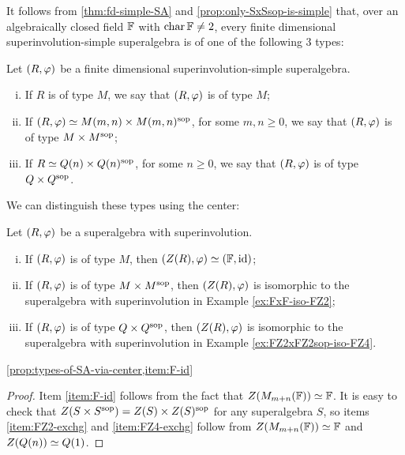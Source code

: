 It follows from \cref{thm:fd-simple-SA} and \cref{prop:only-SxSsop-is-simple} that, over an algebraically closed field $\mathbb{F}$ with $\operatorname{char} \mathbb{F} \neq 2$, every finite dimensional superinvolution-simple superalgebra is of one of the following 3 types:

\begin{defi}\label{defi:types-sinv-simple}
    Let $(R, \varphi)$ be a finite dimensional superinvolution-simple superalgebra. 
    \begin{enumerate}[(i)]
        \item If $R$ is of type $M$, we say that $(R, \varphi)$ is of type $M$;
        \item If $(R, \varphi) \simeq M(m,n) \times M(m,n)^{\mathrm{sop}}$, for some $m,n \geq 0$, we say that $(R, \varphi)$ is of type $M\times M^{\mathrm{sop}}$;
        \item If $R \simeq Q(n) \times Q(n)^{\mathrm{sop}}$, for some $n \geq 0$, we say that $(R, \varphi)$ is of type $Q \times Q^{\mathrm{sop}}$.
    \end{enumerate}
\end{defi}

We can distinguish these types using the center:

\begin{prop}\label{prop:types-of-SA-via-center}
	Let $(R, \varphi)$ be a superalgebra with superinvolution.
	\begin{enumerate}[(i)]
		\item If $(R, \varphi)$ is of type $M$, then $(Z(R), \varphi) \simeq (\mathbb{F}, \operatorname{id})$;\label{item:F-id}
		\item If $(R, \varphi)$ is of type $M\times M^{\mathrm{sop}}$, then $(Z(R), \varphi)$ is isomorphic to the superalgebra with superinvolution in Example \ref{ex:FxF-iso-FZ2};\label{item:FZ2-exchg}
		\item If $(R, \varphi)$ is of type $Q\times Q^{\mathrm{sop}}$, then $(Z(R), \varphi)$ is isomorphic to the superalgebra with superinvolution in Example \ref{ex:FZ2xFZ2sop-iso-FZ4}.\label{item:FZ4-exchg}
	\end{enumerate}
\end{prop}

\cref{prop:types-of-SA-via-center,item:F-id}

\begin{proof}
	Item \eqref{item:F-id} follows from the fact that $Z(M_{m+n}(\mathbb{F})) \simeq \mathbb{F}$.
	It is easy to check that $Z(S\times S^{\mathrm{sop}}) = Z(S) \times Z(S)^{\mathrm{sop}}$ for any superalgebra $S$, so items \eqref{item:FZ2-exchg} and \eqref{item:FZ4-exchg} follow from $Z(M_{m+n}(\mathbb{F})) \simeq \mathbb{F}$ and $Z(Q(n)) \simeq Q(1)$.
\end{proof}

